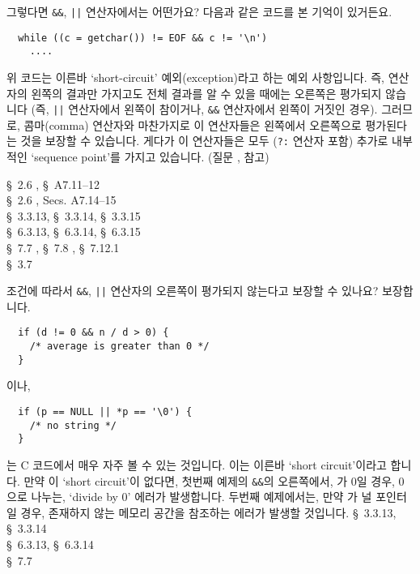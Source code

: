 \begin{faq}
	그렇다면 \verb+&&+, \verb+||+ 연산자에서는 어떤가요?
	다음과 같은 코드를 본 기억이 있거든요.
\begin{verbatim}
  while ((c = getchar()) != EOF && c != '\n')
    ....
\end{verbatim}
\A
	위 코드는 이른바 `short-circuit' 예외(exception)라고 하는
	예외 사항입니다.  즉, 연산자의 왼쪽의 결과만 가지고도 전체
	결과를 알 수 있을 때에는 오른쪽은 평가되지 않습니다 (즉,
	\verb+||+ 연산자에서 왼쪽이 참이거나, \verb+&&+ 연산자에서
	왼쪽이 거짓인 경우).  그러므로, 콤마(comma) 연산자와 마찬가지로
	이 연산자들은 왼쪽에서 오른쪽으로 평가된다는 것을 보장할 수 있습니다.
	게다가 이 연산자들은 모두 (\verb+?:+ 연산자 포함) 추가로
	내부적인 `sequence point'를 가지고 있습니다.  (질문 ,  참고)

\R
	\cite{kr1} \S\ 2.6 , \S\ A7.11--12  \\
	\cite{kr2} \S\ 2.6 , Secs.  A7.14--15  \\
        \cite{ansi} \S\ 3.3.13, \S\ 3.3.14, \S\ 3.3.15 \\
	\cite{c89} \S\ 6.3.13, \S\ 6.3.14, \S\ 6.3.15 \\
	\cite{hs} \S\ 7.7 , \S\ 7.8 , 
		\S\ 7.12.1  \\
	\cite{ctp} \S\ 3.7 
\end{faq}

\begin{faq}
        조건에 따라서 \verb+&&+, \verb+||+ 연산자의 오른쪽이 평가되지 않는다고
        보장할 수 있나요?
\A
        보장합니다.
\begin{verbatim}
  if (d != 0 && n / d > 0) {
    /* average is greater than 0 */
  }
\end{verbatim}
        이나,
\begin{verbatim}
  if (p == NULL || *p == '\0') {
    /* no string */
  }
\end{verbatim}
        는 C 코드에서 매우 자주 볼 수 있는 것입니다. 이는 이른바 `short circuit'이라고
        합니다.  만약 이 `short circuit'이 없다면, 첫번째 예제의 \verb+&&+의 오른쪽에서,
        가 0일 경우, 0으로 나누는, `divide by 0' 에러가 발생합니다.
        두번째 예제에서는, 만약 가 널 포인터일 경우, 존재하지 않는 메모리 공간을
        참조하는 에러가 발생할 것입니다.
\R
        \cite{ansi} \S\ 3.3.13, \S\ 3.3.14 \\
        \cite{c89} \S\ 6.3.13, \S\ 6.3.14 \\
        \cite{hs} \S\ 7.7 
\end{faq}

